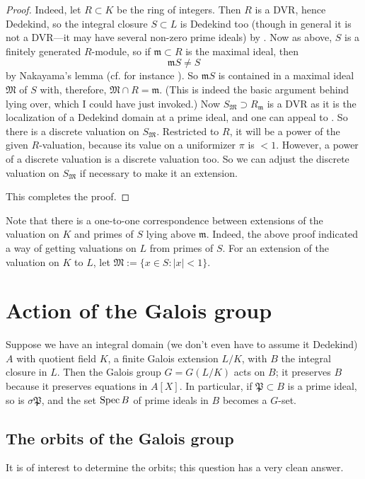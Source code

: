 \begin{proof}
Indeed, let $R \subset K$ be the ring of integers.  Then $R$ is a DVR, hence Dedekind, so the integral closure $S \subset L$ is Dedekind too (though in general it is not   a DVR---it may have several non-zero prime ideals) by .  Now as above, $S$ is a finitely generated $R$-module, so if $\mathfrak{m} \subset R$ is the maximal ideal, then 
\[ \mathfrak{m} S \neq S \]
by Nakayama's lemma (cf. for instance \cite{Ei95}).  So $\mathfrak{m} S$ is contained in a maximal ideal $\mathfrak{M}$ of $S$ with, therefore, $\mathfrak{M} \cap R = \mathfrak{m}$.  (This is indeed the basic argument behind lying over, which I could have just invoked.) Now $S_{\mathfrak{M}} \supset R_{\mathfrak{m}}$ is a DVR as it is the localization of a Dedekind domain at a prime ideal, and one can appeal to .  So there is a discrete valuation on $S_{\mathfrak{M}}$.  Restricted to $R$, it will be a power of the given $R$-valuation, because its value on a uniformizer $\pi$ is $<1$.  However, a power of a discrete valuation is a discrete valuation too.  So we can adjust the discrete valuation on $S_{\mathfrak{M}}$ if necessary to make it an extension.

This completes the proof.  
\end{proof}

Note that there is a one-to-one correspondence between extensions of the valuation on $K$ and primes of $S$ lying above $\mathfrak{m}$.   Indeed, the above proof indicated a way of getting valuations on $L$ from primes of $S$.  For an extension of the valuation on $K$ to $L$, let $\mathfrak{M} := \{ x \in S: \left| x \right| < 1\}$.
\section{Action of the Galois group}

 Suppose we have an integral domain (we don't even have to assume it Dedekind) $A$ with quotient field $K$, a finite Galois extension $L/K$, with $B$ the integral closure in $L$.  Then the Galois group $G = G(L/K)$ acts on $B$; it preserves $B$ because it preserves equations in $A[X]$.
In particular, if $\mathfrak{P} \subset B$ is a prime ideal, so is $\sigma \mathfrak{P}$, and the set $\operatorname{Spec} B$ of prime ideals in $B$ becomes a $G$-set.

\subsection{The orbits of the Galois group} It is of interest to determine the orbits; this question has  a very clean answer.

